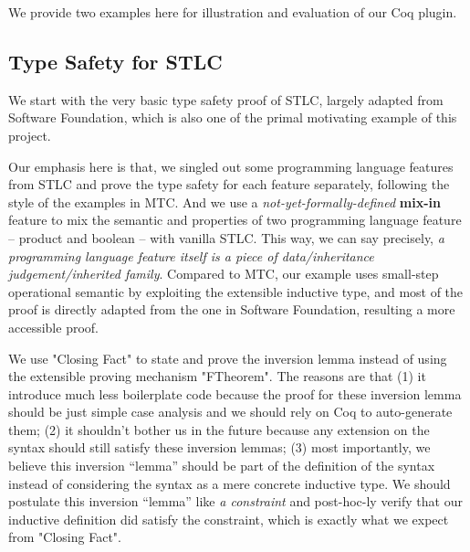 We provide two examples here for illustration and evaluation of our Coq plugin. 

\subsection{Type Safety for STLC}
We start with the very basic type safety proof of STLC, largely adapted from Software Foundation\cite{pierce2014software}, which is also one of the primal motivating example of this project. 

Our emphasis here is that, we singled out some programming language features from STLC and prove the type safety for each feature separately, following the style of the examples in MTC\citep{delaware2013,forsta2020}. And we use a \textit{not-yet-formally-defined} \textbf{mix-in} feature to mix the semantic and properties of two programming language feature -- product and boolean -- with vanilla STLC. This way, we can say precisely, \textit{a programming language feature itself is a piece of data/inheritance judgement/inherited family}. Compared to MTC, our example uses small-step operational semantic by exploiting the extensible inductive type, and most of the proof is directly adapted from the one in Software Foundation, resulting a more accessible proof. 

We use "Closing Fact" to state and prove the inversion lemma instead of using the extensible proving mechanism "FTheorem". The reasons are that (1) it introduce much less boilerplate code because the proof for these inversion lemma should be just simple case analysis and we should rely on Coq to auto-generate them; (2) it shouldn't bother us in the future because any extension on the syntax should still satisfy these inversion lemmas; (3) most importantly, we believe this inversion ``lemma'' should be part of the definition of the syntax instead of considering the syntax as a mere concrete inductive type. We should postulate this inversion ``lemma'' like \textit{a constraint} and post-hoc-ly verify that our inductive definition did satisfy the constraint, which is exactly what we expect from "Closing Fact".

